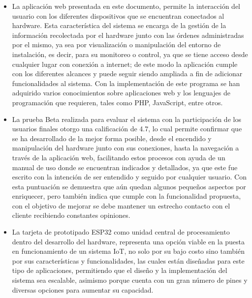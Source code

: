 \begin{frame}
\begin{itemize}
	\item La aplicación web presentada en este documento, permite la interacción del usuario con los diferentes dispositivos que se encuentran conectados al hardware. Esta característica del sistema se encarga de la gestión de la información recolectada por el hardware junto con las órdenes administradas por el mismo, ya sea por visualización o manipulación del entorno de instalación, es decir, para su monitoreo o control, ya que se tiene acceso desde cualquier lugar con conexión a internet; de este modo la aplicación cumple con los diferentes alcances y puede seguir siendo ampliada a fin de adicionar funcionalidades al sistema. Con la implementación de este programa se han adquirido varios conocimientos sobre aplicaciones web y los lenguajes de programación que requieren, tales como PHP, JavaScript, entre otros.\\
\end{itemize}
\end{frame}


\begin{frame}
\begin{itemize}
	\item La prueba Beta realizada para evaluar el sistema con la participación de los usuarios finales otorgo una calificación de 4.7, lo cual permite confirmar que se ha desarrollado de la mejor forma posible, desde el encendido y manipulación del hardware junto con sus conexiones, hasta la navegación a través de la aplicación web, facilitando estos procesos con ayuda de un manual de uso donde se encuentran indicados y detallados, ya que este fue escrito con la intención de ser entendido y seguido por cualquier usuario. Con esta puntuación se demuestra que aún quedan algunos pequeños aspectos por enriquecer, pero también indica que cumple con la funcionalidad propuesta, con el objetivo de mejorar se debe mantener un estrecho contacto con el cliente recibiendo constantes opiniones.\\
\end{itemize}
\end{frame}


\begin{frame}
\begin{itemize}
	\item La tarjeta de prototipado ESP32 como unidad central de procesamiento dentro del desarrollo del hardware, representa una opción viable en la puesta en funcionamiento de un sistema IoT, no solo por su bajo costo sino también por sus características y funcionalidades, las cuales están diseñadas para este tipo de aplicaciones, permitiendo que el diseño y la implementación del sistema sea escalable, asimismo porque cuenta con un gran número de pines y diversas opciones para aumentar su capacidad.\\
\end{itemize}
\end{frame}


